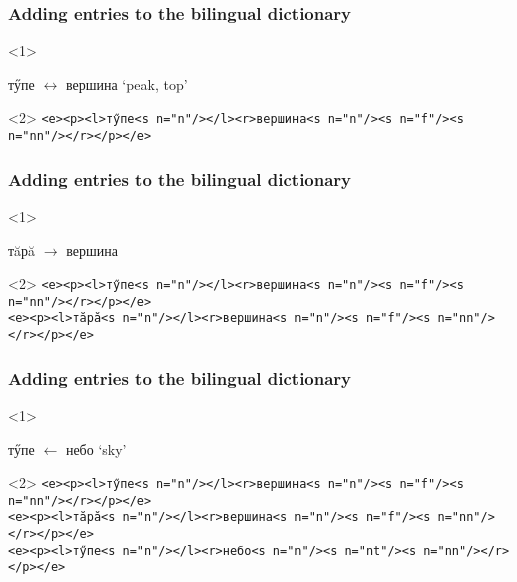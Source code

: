 \documentclass[10pt,xetex]{beamer} %
\begin{document}
\begin{frame}
 \frametitle{Adding entries to the bilingual dictionary}

\begin{onlyenv}<1>
\begin{center}
тӳпе $\leftrightarrow$ вершина `peak, top'
\end{center}
\end{onlyenv}
\begin{onlyenv}<2>
{\tt <e><p><l>тӳпе<s n="n"/></l><r>вершина<s n="n"/><s n="f"/><s n="nn"/></r></p></e>}

\end{onlyenv}

\end{frame}


\begin{frame}
 \frametitle{Adding entries to the bilingual dictionary}

\begin{onlyenv}<1>
\begin{center}
тăрă $\rightarrow$ вершина
\end{center}
\end{onlyenv}
\begin{onlyenv}<2>
{\tt <e><p><l>тӳпе<s n="n"/></l><r>вершина<s n="n"/><s n="f"/><s n="nn"/></r></p></e>}\\
{\tt <e><p><l>тăрă<s n="n"/></l><r>вершина<s n="n"/><s n="f"/><s n="nn"/></r></p></e>} \\

\end{onlyenv}

\end{frame}

\begin{frame}
 \frametitle{Adding entries to the bilingual dictionary}

\begin{onlyenv}<1>
\begin{center}
тӳпе $\leftarrow$ небо `sky'
\end{center}
\end{onlyenv}
\begin{onlyenv}<2>
{\tt <e><p><l>тӳпе<s n="n"/></l><r>вершина<s n="n"/><s n="f"/><s n="nn"/></r></p></e>} \\
{\tt <e><p><l>тăрă<s n="n"/></l><r>вершина<s n="n"/><s n="f"/><s n="nn"/></r></p></e>}  \\
{\tt <e><p><l>тӳпе<s n="n"/></l><r>небо<s n="n"/><s n="nt"/><s n="nn"/></r></p></e>} \\

\end{onlyenv}

\end{frame}
\end{document}
